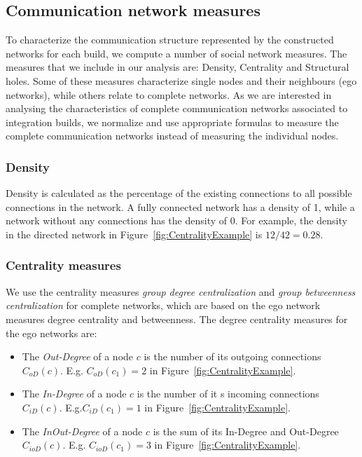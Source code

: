 \subsection{Communication network measures}
To characterize the communication structure represented by the constructed
networks for each build, we compute a number of social network measures. The
measures that we include in our analysis are: Density, Centrality and Structural
holes. Some of these measures characterize single nodes and their neighbours (ego
networks), while others relate to complete networks. As we are interested in
analysing the characteristics of complete communication networks associated to
integration builds, we normalize and use appropriate formulas to measure the
complete communication networks instead of measuring the individual nodes.


\subsubsection{Density}
Density is calculated as the percentage of the existing connections to all
possible connections in the network. A fully connected network has a density of
1, while a network without any connections has the density of 0. For example, the
density in the directed network in Figure~\ref{fig:CentralityExample} is
$12/42=0.28$.

\subsubsection{Centrality measures}
We use the centrality measures \emph{group degree centralization} and
\emph{group betweenness centralization} for complete networks, which are based on
the ego network measures degree centrality and betweenness. The degree
centrality measures for the ego networks are:

\begin{itemize}
  \item The \emph{Out-Degree} of a node $c$ is the
  number of its outgoing connections $C_{oD}(c)$. E.g. $C_{oD}(c_1)=2$ in 
  Figure~\ref{fig:CentralityExample}.
  
  \item The \emph{In-Degree} of a node $c$ is the
  number of it s incoming connections $C_{iD}(c)$. E.g.$C_{iD}(c_1)=1$ 
  in Figure~\ref{fig:CentralityExample}.
  
  \item The \emph{InOut-Degree} of a node $c$ is the sum of its In-Degree and
  Out-Degree $C_{ioD}(c)$. E.g. $C_{ioD}(c_1)=3$
  in Figure~\ref{fig:CentralityExample}.
\end{itemize}

